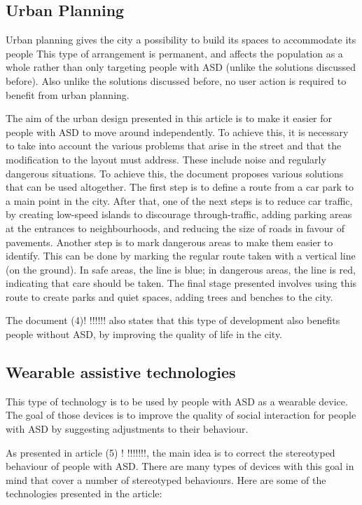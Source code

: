 \subsection{Urban Planning}

Urban planning gives the city a possibility to build its spaces to accommodate its people This type of arrangement is permanent, and affects the population as a whole rather than only targeting people with ASD (unlike the solutions discussed before). Also unlike the solutions discussed before, no user action is required to benefit from urban planning.

The aim of the urban design presented in this article is to make it easier for people with ASD to move around independently. To achieve this, it is necessary to take into account the various problems that arise in the street and that the modification to the layout must address. These include noise and regularly dangerous situations. To achieve this, the document proposes various solutions that can be used altogether. The first step is to define a route from a car park to a main point in the city. After that, one of the next steps is to reduce car traffic, by creating low-speed islands to discourage through-traffic, adding parking areas at the entrances to neighbourhoods, and reducing the size of roads in favour of pavements. Another step is to mark dangerous areas to make them easier to identify. This can be done by marking the regular route taken with a vertical line (on the ground). In safe areas, the line is blue; in dangerous areas, the line is red, indicating that care should be taken. The final stage presented involves using this route to create parks and quiet spaces, adding trees and benches to the city.

The document (4)! !!!!!! also states that this type of development also benefits people without ASD, by improving the quality of life in the city.

\subsection{Wearable assistive technologies}

This type of technology is to be used by people with ASD as a wearable device. The goal of those devices is to improve the quality of social interaction for people with ASD by suggesting adjustments to their behaviour.

As presented in article (5) ! !!!!!!!, the main idea is to correct the stereotyped behaviour of people with ASD. There are many types of devices with this goal in mind that cover a number of stereotyped behaviours. Here are some of the technologies presented in the article:

